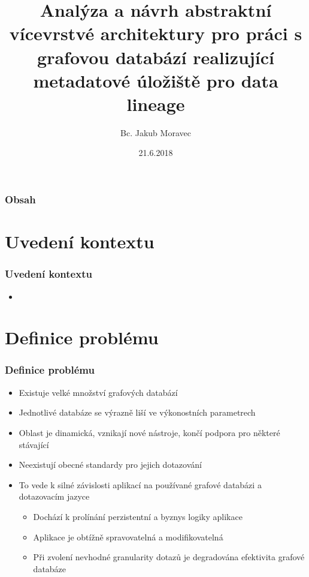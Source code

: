 \documentclass{beamer}
\title[Diplomová práce]{Analýza a návrh abstraktní vícevrstvé architektury pro práci s grafovou databází realizující metadatové úložiště pro data lineage} %
\author{Bc. Jakub Moravec} %
\institute[ČVUT] %
{
Vedoucí: Ing. Michal Valenta, Ph.D. \\
Oponent: Ing. Jiří Šebek \\
\medskip
České vysoké učení technické v Praze \\
Fakulta Elektrotechnická \\
Otevřená Informatika, Softwarové Inženýrství \\
}
\date{21.6.2018} %
\begin{document}
\begin{frame}
\titlepage
\end{frame}

\begin{frame}
\frametitle{Obsah}
\tableofcontents
\end{frame}



\section{Uvedení kontextu}
\begin{frame}
\frametitle{Uvedení kontextu}
   \begin{itemize}
      \item
   \end{itemize}
\end{frame}

\section{Definice problému}
\begin{frame}
\frametitle{Definice problému}
   \begin{itemize}
      \item Existuje velké množství grafových databází
      \item Jednotlivé databáze se výrazně liší ve výkonostních parametrech
      \item Oblast je dinamická, vznikají nové nástroje, končí podpora pro některé stávající
      \item Neexistují obecné standardy pro jejich dotazování
      \item To vede k silné závislosti aplikací na používané grafové databázi a dotazovacím jazyce
      \begin{itemize}
         \item Dochází k prolínání perzistentní a byznys logiky aplikace
         \item Aplikace je obtížně spravovatelná a modifikovatelná
         \item Při zvolení nevhodné granularity dotazů je degradována efektivita grafové databáze
      \end{itemize}
   \end{itemize}
\end{frame}
\end{document}
